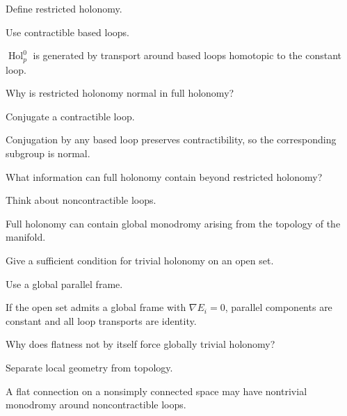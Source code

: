 \begin{exercise}\label{exr:vii25-09}
Define restricted holonomy.
\end{exercise}
\begin{hint}
Use contractible based loops.
\end{hint}
\begin{solution}
\(\operatorname{Hol}^0_p\) is generated by transport around based loops homotopic to the constant loop.
\end{solution}


\begin{exercise}\label{exr:vii25-10}
Why is restricted holonomy normal in full holonomy?
\end{exercise}
\begin{hint}
Conjugate a contractible loop.
\end{hint}
\begin{solution}
Conjugation by any based loop preserves contractibility, so the corresponding subgroup is normal.
\end{solution}


\begin{exercise}\label{exr:vii25-11}
What information can full holonomy contain beyond restricted holonomy?
\end{exercise}
\begin{hint}
Think about noncontractible loops.
\end{hint}
\begin{solution}
Full holonomy can contain global monodromy arising from the topology of the manifold.
\end{solution}


\begin{exercise}\label{exr:vii25-12}
Give a sufficient condition for trivial holonomy on an open set.
\end{exercise}
\begin{hint}
Use a global parallel frame.
\end{hint}
\begin{solution}
If the open set admits a global frame with \(\nabla E_i=0\), parallel components are constant and all loop transports are identity.
\end{solution}


\begin{exercise}\label{exr:vii25-13}
Why does flatness not by itself force globally trivial holonomy?
\end{exercise}
\begin{hint}
Separate local geometry from topology.
\end{hint}
\begin{solution}
A flat connection on a nonsimply connected space may have nontrivial monodromy around noncontractible loops.
\end{solution}


